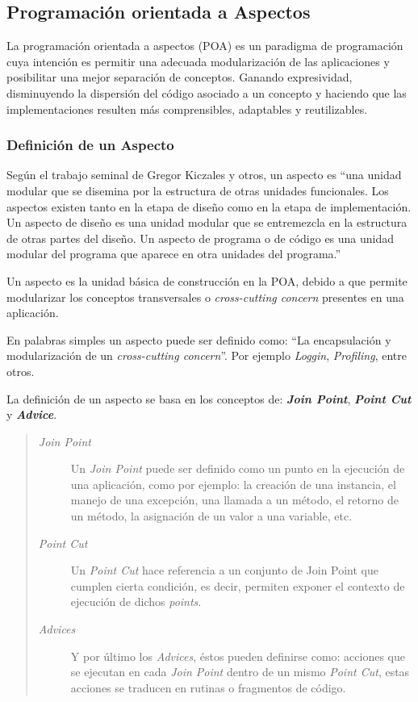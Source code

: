 \subsection{Programación orientada a Aspectos}

	La programación orientada a aspectos (POA) es un paradigma de programación cuya
	intención es permitir una adecuada modularización de las aplicaciones
	y posibilitar una mejor separación de conceptos. Ganando expresividad,
	disminuyendo la dispersión del código asociado a un concepto y haciendo que
	las implementaciones resulten más comprensibles, adaptables y reutilizables.


\subsubsection{Definición de un Aspecto}
	Según el trabajo seminal de Gregor Kiczales y otros, un aspecto es 
	``una unidad modular que se disemina por la estructura de
	otras unidades funcionales. Los aspectos existen tanto en la etapa de
	diseño como en la etapa de implementación. Un aspecto de diseño es
	una unidad modular que se entremezcla en la estructura de otras partes
	del diseño. Un aspecto de programa o de código es una unidad modular
	del programa que aparece en otra unidades del programa.'' \cite{Kicz97a}

	\bigskip
	
	Un aspecto es la unidad básica de construcción en la POA, debido a que permite
	modularizar los conceptos transversales o \emph{cross-cutting concern} presentes en una aplicación.
	
	En palabras simples un aspecto puede ser definido como: ``La encapsulación y
	modularización de un \emph{cross-cutting concern}''. Por ejemplo
	\emph{Loggin}, \emph{Profiling}, entre otros.
	
	
	La definición de un aspecto se basa en los conceptos de: {\bf \emph{Join
	Point}}, {\bf \emph{ Point Cut}} y {\bf \emph{ Advice}}.
	
	\begin{quote}
	
	\begin{description}
		\item[\emph{Join Point}] Un \emph{Join Point} puede ser definido como un punto
		en la ejecución de una aplicación, como por ejemplo: la creación de una instancia, el manejo de una
		excepción, una llamada a un método, el retorno de un método, la asignación de
		un valor a una variable, etc.
		
		\item[\emph{Point Cut}] Un \emph{Point Cut} hace referencia a un conjunto de
		Join Point que cumplen cierta condición, es decir, permiten exponer el contexto de
		ejecución de dichos \emph{points}.
		
		\item[\emph{Advices}] Y por último los \emph{Advices}, éstos pueden definirse
		como: acciones que se ejecutan en cada \emph{Join Point} dentro de un mismo
		\emph{Point Cut}, estas acciones se traducen en rutinas o fragmentos de
		código.
	
	\end{description}
	\end{quote}
	
	
